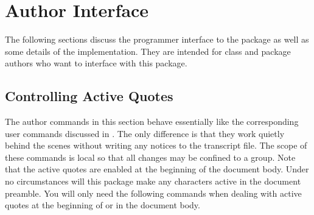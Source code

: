 \documentclass{ltxdockit}[2010/09/26]
\begin{document}
\section{Author Interface}
\label{aut}

The following sections discuss the programmer interface to the  package as well as some details of the implementation. They are intended for class and package authors who want to interface with this package.

\subsection{Controlling Active Quotes}
\label{aut:ctl}

The author commands in this section behave essentially like the corresponding user commands discussed in . The only difference is that they work quietly behind the scenes without writing any notices to the transcript file. The scope of these commands is local so that all changes may be confined to a group. Note that the active quotes are enabled at the beginning of the document body. Under no circumstances will this package make any characters active in the document preamble. You will only need the following commands when dealing with active quotes at the beginning of or in the document body.
\end{document}
